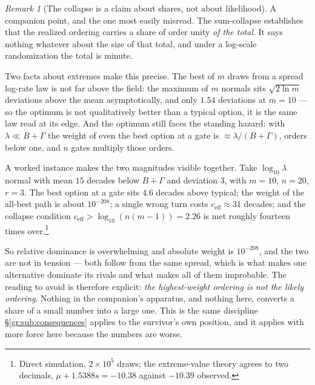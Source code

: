\documentclass[11pt]{article}
\numberwithin{equation}{section}
\theoremstyle{plain}
\theoremstyle{definition}
\theoremstyle{remark}
\newtheorem{remark}[theorem]{Remark}
\begin{document}
\begin{remark}[The collapse is a claim about shares, not about
likelihood]\label{sch:rem:absolute}
A companion point, and the one most easily misread. The sum-collapse
establishes that the realized ordering carries a share of order unity
\emph{of the total}. It says nothing whatever about the size of that
total, and under a log-scale randomization the total is minute.

Two facts about extremes make this precise. The best of $m$ draws from a
spread log-rate law is not far above the field: the maximum of $m$
normals sits $\sqrt{2\ln m}$ deviations above the mean asymptotically,
and only $1.54$ deviations at $m=10$ --- so the optimum is not
qualitatively better than a typical option, it is the same law read at
its edge. And the optimum still faces the standing hazard: with
$\lambda\ll B+\Gamma$ the weight of even the best option at a gate is
$\approx\lambda/(B+\Gamma)$, orders below one, and $n$ gates multiply
those orders.

A worked instance makes the two magnitudes visible together. Take
$\log_{10}\lambda$ normal with mean $15$ decades below $B+\Gamma$ and
deviation $3$, with $m=10$, $n=20$, $r=3$. The best option at a gate
sits $4.6$ decades above typical; the weight of the all-best path is
about $10^{-208}$; a single wrong turn costs $c_{\mathrm{eff}}\approx31$
decades; and the collapse condition $c_{\mathrm{eff}}>\log_{10}(n(m-1))
=2.26$ is met roughly fourteen times over.\footnote{Direct simulation,
$2\times10^{5}$ draws; the extreme-value theory agrees to two decimals,
$\mu+1.5388s=-10.38$ against $-10.39$ observed.}

So relative dominance is overwhelming and absolute weight is
$10^{-208}$, and the two are not in tension --- both follow from the
same spread, which is what makes one alternative dominate its rivals and
what makes all of them improbable. The reading to avoid is therefore
explicit: \emph{the highest-weight ordering is not the likely ordering}.
Nothing in the companion's apparatus, and nothing here, converts a share
of a small number into a large one. This is the same discipline
\S\ref{gr:sub:consequences} applies to the survivor's own position, and
it applies with more force here because the numbers are worse.
\end{remark}
\end{document}
